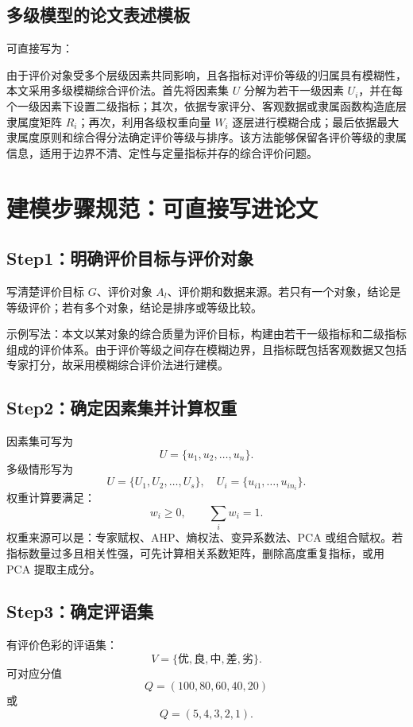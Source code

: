 \documentclass[UTF8,zihao=-4,fontset=none]{ctexart}
\begin{document}
\subsection{多级模型的论文表述模板}
可直接写为：

由于评价对象受多个层级因素共同影响，且各指标对评价等级的归属具有模糊性，本文采用多级模糊综合评价法。首先将因素集 $U$ 分解为若干一级因素 $U_i$，并在每个一级因素下设置二级指标；其次，依据专家评分、客观数据或隶属函数构造底层隶属度矩阵 $R_i$；再次，利用各级权重向量 $W_i$ 逐层进行模糊合成；最后依据最大隶属度原则和综合得分法确定评价等级与排序。该方法能够保留各评价等级的隶属信息，适用于边界不清、定性与定量指标并存的综合评价问题。

\section{建模步骤规范：可直接写进论文}
\subsection{Step1：明确评价目标与评价对象}
写清楚评价目标 $G$、评价对象 $A_l$、评价期和数据来源。若只有一个对象，结论是等级评价；若有多个对象，结论是排序或等级比较。

示例写法：本文以某对象的综合质量为评价目标，构建由若干一级指标和二级指标组成的评价体系。由于评价等级之间存在模糊边界，且指标既包括客观数据又包括专家打分，故采用模糊综合评价法进行建模。

\subsection{Step2：确定因素集并计算权重}
因素集可写为
\begin{equation}
  U=\{u_1,u_2,\ldots,u_n\}.
\end{equation}
多级情形写为
\begin{equation}
  U=\{U_1,U_2,\ldots,U_s\},\quad U_i=\{u_{i1},\ldots,u_{in_i}\}.
\end{equation}
权重计算要满足：
\begin{equation}
  w_i\ge 0,\qquad \sum_i w_i=1.
\end{equation}
权重来源可以是：专家赋权、AHP、熵权法、变异系数法、PCA 或组合赋权。若指标数量过多且相关性强，可先计算相关系数矩阵，删除高度重复指标，或用 PCA 提取主成分。

\subsection{Step3：确定评语集}
有评价色彩的评语集：
\begin{equation}
  V=\{\text{优},\text{良},\text{中},\text{差},\text{劣}\}.
\end{equation}
可对应分值
\begin{equation}
  Q=(100,80,60,40,20)
\end{equation}
或
\begin{equation}
  Q=(5,4,3,2,1).
\end{equation}
\end{document}
